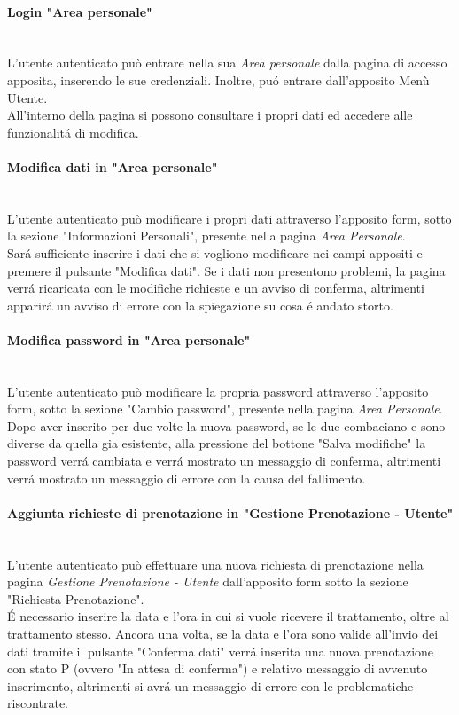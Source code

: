 \documentclass[]{article}
\begin{document}
\paragraph{Login "Area personale"}\mbox{}\\
L'utente autenticato può entrare nella sua \textit{Area personale} dalla pagina di accesso apposita, inserendo le sue credenziali. Inoltre, puó entrare dall'apposito Menù Utente.\\
All'interno della pagina si possono consultare i propri dati ed accedere alle funzionalitá di modifica.

\paragraph{Modifica dati in "Area personale"}\mbox{}\\
L'utente autenticato può modificare i propri dati attraverso l'apposito form, sotto la sezione "Informazioni Personali", presente nella pagina \textit{Area Personale}.\\
Sará sufficiente inserire i dati che si vogliono modificare nei campi appositi e premere il pulsante "Modifica dati". Se i dati non presentono problemi, la pagina verrá ricaricata con le modifiche richieste e un avviso di conferma, altrimenti apparirá un avviso di errore con la spiegazione su cosa é andato storto.

\paragraph{Modifica password in "Area personale"}\mbox{}\\
L'utente autenticato può modificare la propria password attraverso l'apposito form, sotto la sezione "Cambio password", presente nella pagina \textit{Area Personale}.\\
Dopo aver inserito per due volte la nuova password, se le due combaciano e sono diverse da quella gia esistente, alla pressione del bottone "Salva modifiche" la password verrá cambiata e verrá mostrato un messaggio di conferma, altrimenti verrá mostrato un messaggio di errore con la causa del fallimento.

\paragraph{Aggiunta richieste di prenotazione in "Gestione Prenotazione - Utente"}\mbox{}\\
L'utente autenticato può effettuare una nuova richiesta di prenotazione nella pagina \textit{Gestione Prenotazione - Utente} dall'apposito form sotto la sezione "Richiesta Prenotazione".\\
É necessario inserire la data e l'ora in cui si vuole ricevere il trattamento, oltre al trattamento stesso. Ancora una volta, se la data e l'ora sono valide all'invio dei dati tramite il pulsante "Conferma dati" verrá inserita una nuova prenotazione con stato P (ovvero "In attesa di conferma") e relativo messaggio di avvenuto inserimento, altrimenti si avrá un messaggio di errore con le problematiche riscontrate.
\end{document}
